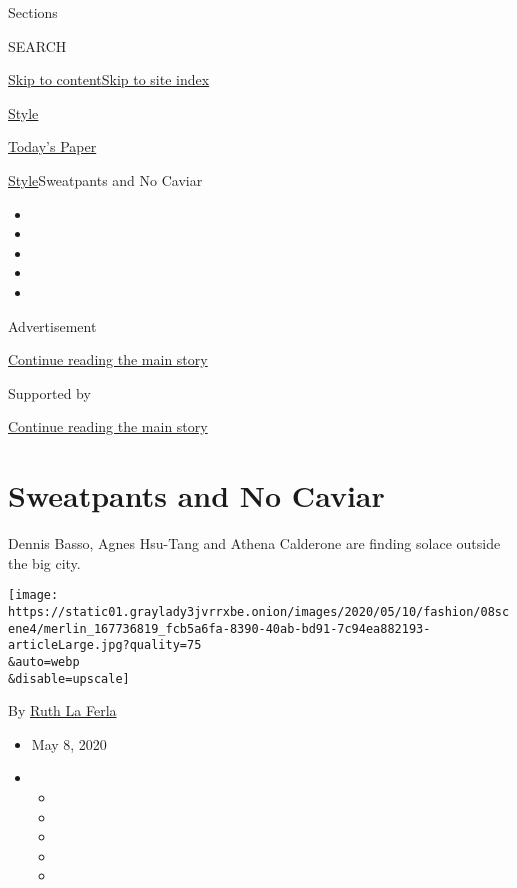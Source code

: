 Sections

SEARCH

\protect\hyperlink{site-content}{Skip to
content}\protect\hyperlink{site-index}{Skip to site index}

\href{https://www.nytimes3xbfgragh.onion/section/style}{Style}

\href{https://myaccount.nytimes3xbfgragh.onion/auth/login?response_type=cookie\&client_id=vi}{}

\href{https://www.nytimes3xbfgragh.onion/section/todayspaper}{Today's
Paper}

\href{/section/style}{Style}\textbar{}Sweatpants and No Caviar

\begin{itemize}
\item
\item
\item
\item
\item
\end{itemize}

Advertisement

\protect\hyperlink{after-top}{Continue reading the main story}

Supported by

\protect\hyperlink{after-sponsor}{Continue reading the main story}

\hypertarget{sweatpants-and-no-caviar}{%
\section{Sweatpants and No Caviar}\label{sweatpants-and-no-caviar}}

Dennis Basso, Agnes Hsu-Tang and Athena Calderone are finding solace
outside the big city.

\texttt{[image: https://static01.graylady3jvrrxbe.onion/images/2020/05/10/fashion/08scene4/merlin\_167736819\_fcb5a6fa-8390-40ab-bd91-7c94ea882193-articleLarge.jpg?quality=75\\\&auto=webp\\\&disable=upscale]}

By \href{https://www.nytimes3xbfgragh.onion/by/ruth-la-ferla}{Ruth La
Ferla}

\begin{itemize}
\item
  May 8, 2020
\item
  \begin{itemize}
  \item
  \item
  \item
  \item
  \item
  \end{itemize}
\end{itemize}

